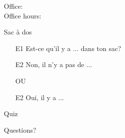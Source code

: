 \documentclass{beamer}
\subtitle[Il y a, c'est, ce sont]{Il y a, c'est, ce sont}
\begin{document}
  \begin{frame}
    \titlepage
    \tiny{Office: \\
          Office hours: }
  \end{frame}


  \begin{frame}{Sac à dos}
    \begin{itemize}
      \item[E1] Est-ce qu'il y a ... dans ton sac?
      \item[E2] Non, il n'y a pas de ...
      \item[] OU
      \item[E2] Oui, il y a ...
    \end{itemize}
  \end{frame}

  \begin{frame}{}
    \begin{center}
      \Large Quiz
    \end{center}
  \end{frame}

  \begin{frame}{}
    \begin{center}
      \Large Questions?
    \end{center}
  \end{frame}
\end{document}
